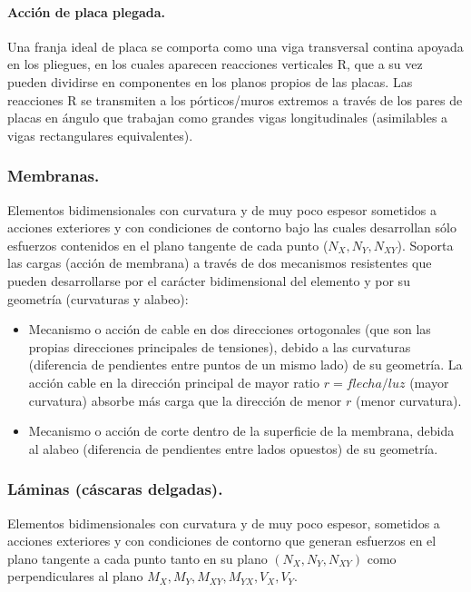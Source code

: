 \paragraph{Acción de placa plegada.}
Una franja ideal de placa se comporta como una viga transversal contina apoyada en los pliegues, en los cuales aparecen reacciones verticales R, que a su vez pueden dividirse en componentes en los planos propios de las placas. Las reacciones R se transmiten a los pórticos/muros extremos a través de los pares de placas en ángulo que trabajan como grandes vigas longitudinales (asimilables a vigas rectangulares equivalentes).

\subsubsection{Membranas.}
Elementos bidimensionales con curvatura y de muy poco espesor sometidos a acciones exteriores y con condiciones de contorno bajo las cuales desarrollan sólo esfuerzos contenidos en el plano tangente de cada punto ($N_X, N_Y, N_{XY}$). Soporta las cargas (acción de membrana) a través de dos mecanismos resistentes que pueden desarrollarse por el carácter bidimensional del elemento y por su geometría (curvaturas y alabeo):

\begin{itemize}
    \item Mecanismo o acción de cable en dos direcciones ortogonales (que son las propias direcciones principales de tensiones), debido a las curvaturas (diferencia de pendientes entre puntos de un mismo lado) de su geometría. La acción cable en la dirección principal de mayor ratio $r = flecha/luz$ (mayor curvatura) absorbe más carga que la dirección de menor $r$ (menor curvatura).
    \item Mecanismo o acción de corte dentro de la superficie de la membrana, debida al alabeo (diferencia de pendientes entre lados opuestos) de su geometría.
\end{itemize}

\subsubsection{Láminas (cáscaras delgadas).}
Elementos bidimensionales con curvatura y de muy poco espesor, sometidos a acciones exteriores y con condiciones de contorno que generan esfuerzos en el plano tangente a cada punto tanto en su plano $(N_X, N_Y, N_{XY})$ como perpendiculares al plano $M_X, M_Y, M_{XY}, M_{YX}, V_X, V_Y$.


